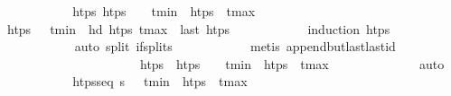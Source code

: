 \begin{isabellebody}
\ \ \ \ \ \ \ \ \isamarkupfalse%
\ \isamarkupfalse%
\ {\isachardoublequoteopen}{\isasymexists}htps{\isacharprime}{\kern0pt}{\isachardot}{\kern0pt}\ htps\ {\isacharequal}{\kern0pt}\ {\isacharbrackleft}{\kern0pt}{\isacharbrackright}{\kern0pt}\ {\isacharat}{\kern0pt}\ t\isactrlsub m\isactrlsub i\isactrlsub n\ {\isacharhash}{\kern0pt}\ htps{\isacharprime}{\kern0pt}\ {\isacharat}{\kern0pt}\ t\isactrlsub m\isactrlsub a\isactrlsub x\ {\isacharhash}{\kern0pt}\ {\isacharbrackleft}{\kern0pt}{\isacharbrackright}{\kern0pt}{\isachardoublequoteclose}\isanewline
\ \ \ \ \ \ \ \ \ \ \isamarkupfalse%
\ {\isacartoucheopen}htps\ {\isasymnoteq}\ {\isacharbrackleft}{\kern0pt}{\isacharbrackright}{\kern0pt}{\isacartoucheclose}\ {\isacartoucheopen}t\isactrlsub m\isactrlsub i\isactrlsub n\ {\isacharequal}{\kern0pt}\ hd\ htps{\isacartoucheclose}\ {\isacartoucheopen}t\isactrlsub m\isactrlsub a\isactrlsub x\ {\isacharequal}{\kern0pt}\ last\ htps{\isacartoucheclose}\isanewline
\ \ \ \ \ \ \ \ \ \ \isamarkupfalse%
\ {\isacharparenleft}{\kern0pt}induction\ htps{\isacharparenright}{\kern0pt}\isanewline
\ \ \ \ \ \ \ \ \ \ \isamarkupfalse%
\ {\isacharparenleft}{\kern0pt}auto\ split{\isacharcolon}{\kern0pt}\ if{\isacharunderscore}{\kern0pt}splits{\isacharparenright}{\kern0pt}\isanewline
\ \ \ \ \ \ \ \ \ \ \isamarkupfalse%
\ {\isacharparenleft}{\kern0pt}metis\ append{\isacharunderscore}{\kern0pt}butlast{\isacharunderscore}{\kern0pt}last{\isacharunderscore}{\kern0pt}id{\isacharparenright}{\kern0pt}\isanewline
\ \ \ \ \ \ \ \ \ \ \isamarkupfalse%
\isanewline
\ \ \ \ \ \ \ \ \isamarkupfalse%
\ \isamarkupfalse%
\ htps{\isacharprime}{\kern0pt}\ \ {\isachardoublequoteopen}htps\ {\isacharequal}{\kern0pt}\ {\isacharbrackleft}{\kern0pt}{\isacharbrackright}{\kern0pt}\ {\isacharat}{\kern0pt}\ t\isactrlsub m\isactrlsub i\isactrlsub n\ {\isacharhash}{\kern0pt}\ htps{\isacharprime}{\kern0pt}\ {\isacharat}{\kern0pt}\ t\isactrlsub m\isactrlsub a\isactrlsub x\ {\isacharhash}{\kern0pt}\ {\isacharbrackleft}{\kern0pt}{\isacharbrackright}{\kern0pt}{\isachardoublequoteclose}\isanewline
\ \ \ \ \ \ \ \ \ \ \isamarkupfalse%
\ auto\isanewline
\ \ \ \ \ \ \ \ \isamarkupfalse%
\ \isamarkupfalse%
\ {\isachardoublequoteopen}htps{\isacharunderscore}{\kern0pt}seq\ {\isasympi}s\ {\isacharparenleft}{\kern0pt}{\isacharbrackleft}{\kern0pt}{\isacharbrackright}{\kern0pt}\ {\isacharat}{\kern0pt}\ t\isactrlsub m\isactrlsub i\isactrlsub n\ {\isacharhash}{\kern0pt}\ htps{\isacharprime}{\kern0pt}\ {\isacharat}{\kern0pt}\ t\isactrlsub m\isactrlsub a\isactrlsub x\ {\isacharhash}{\kern0pt}\ {\isacharbrackleft}{\kern0pt}{\isacharbrackright}{\kern0pt}{\isacharparenright}{\kern0pt}{\isachardoublequoteclose}\isanewline

\end{isabellebody}
